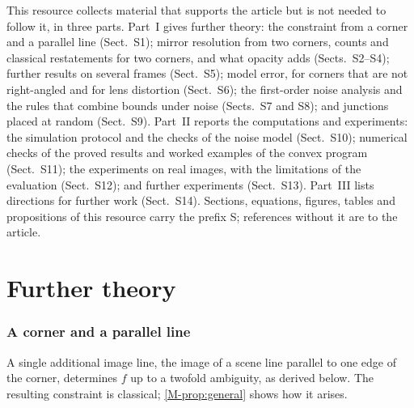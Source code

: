 \noindent This resource collects material that supports the article but is not needed to follow it, in three parts. Part~I gives further theory: the constraint from a corner and a parallel line (Sect.~S1); mirror resolution from two corners, counts and classical restatements for two corners, and what opacity adds (Sects.~S2--S4); further results on several frames (Sect.~S5); model error, for corners that are not right-angled and for lens distortion (Sect.~S6); the first-order noise analysis and the rules that combine bounds under noise (Sects.~S7 and S8); and junctions placed at random (Sect.~S9). Part~II reports the computations and experiments: the simulation protocol and the checks of the noise model (Sect.~S10); numerical checks of the proved results and worked examples of the convex program (Sect.~S11); the experiments on real images, with the limitations of the evaluation (Sect.~S12); and further experiments (Sect.~S13). Part~III lists directions for further work (Sect.~S14). Sections, equations, figures, tables and propositions of this resource carry the prefix S; references without it are to the article.

\part{Further theory}

\section{A corner and a parallel line}\label{sec:solver}

A single additional image line, the image of a scene line parallel to one edge of the corner, determines $f$ up to a twofold ambiguity, as derived below. The resulting constraint is classical; \cref{M-prop:general} shows how it arises.

